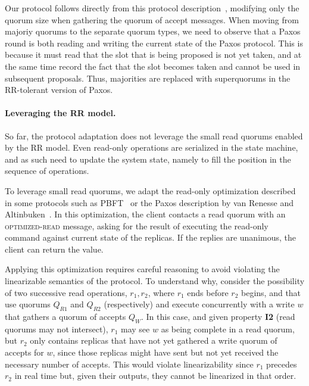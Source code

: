 Our protocol follows directly from this protocol
description~\cite{paxos_builders}, modifying only the quorum size
when gathering the quorum of accept messages. When moving from
majoriy quorums to the separate quorum
types, we need to observe that a Paxos round is both reading and writing
the current state of the Paxos protocol. This is because it must
read that the slot that is being proposed is not yet taken, and
at the same time record the fact that the slot becomes taken and
cannot be used in subsequent proposals. Thus, majorities are
replaced with superquorums in the \ac{RR}-tolerant version of
Paxos.


\paragraph{Leveraging the \ac{RR} model.}
So far, the protocol adaptation does not leverage the
small read quorums enabled by the \ac{RR} model. Even
read-only operations are serialized in the state machine, and as
such need to update the system state, namely to fill the position
in the sequence of operations.

To leverage small read quorums, we adapt the read-only
optimization described in some protocols such as PBFT~\cite{pbft} or
the Paxos description by van Renesse and Altinbuken~\cite{pmmc}.  In
this optimization, the client contacts a read quorum with an
\textsc{optimized-read} message, asking for the
result of executing the read-only command against current state of the
replicas. If the replies are unanimous, the client can return the
value.

Applying this optimization requires careful reasoning to avoid
violating the linearizable semantics of the protocol. To understand why, consider the possibility of two
successive read operations, $r_1, r_2$, where $r_1$ ends before
$r_2$ begins, and that use quorums $Q_{R1}$ and $Q_{R2}$
(respectively) and execute concurrently with a write $w$ that
gathers a quorum of accepts $Q_W$. In this case, and given
property \textbf{I2} (read quorums may not intersect), $r_1$ may
see $w$ as being complete in a read quorum, but $r_2$ only
contains replicas that have not yet gathered a write quorum of
accepts for $w$, since those replicas might have sent but not yet
received the necessary number of accepts. This would violate
linearizability since $r_1$ precedes $r_2$ in real time but,
given their outputs, they cannot be linearized in that order.

